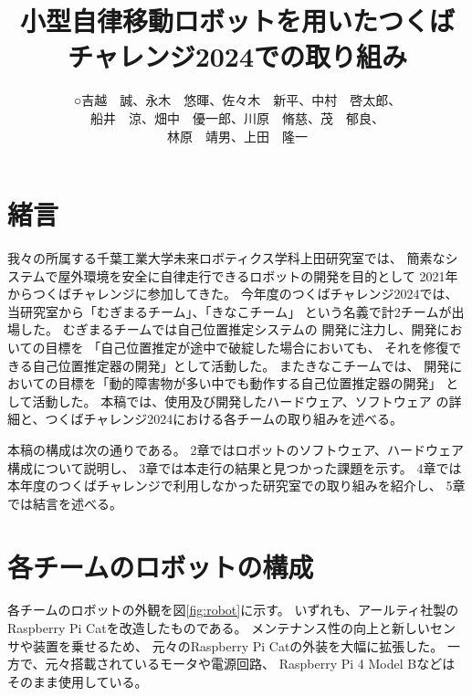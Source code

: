 \documentclass[twocolumn,9pt]{jsproceedings}
\title{小型自律移動ロボットを用いたつくばチャレンジ2024での取り組み}
\author{○吉越　誠\authorrefmark{2}、永木　悠暉\authorrefmark{1}、佐々木　新平\authorrefmark{1}、中村　啓太郎\authorrefmark{1}、
\\船井　涼\authorrefmark{2}、畑中　優一郎\authorrefmark{2}、川原　脩慈\authorrefmark{1}、茂　郁良\authorrefmark{1}、
\\林原　靖男\authorrefmark{1}、上田　隆一\authorrefmark{1}}
\affiliation{千葉工業大学 未来ロボティクス学科 上田研究室 むぎまるチーム/きなこチーム}
\begin{document}
\maketitle


\section{緒言}

我々の所属する千葉工業大学未来ロボティクス学科上田研究室では、
簡素なシステムで屋外環境を安全に自律走行できるロボットの開発を目的として
2021年からつくばチャレンジに参加してきた。
今年度のつくばチャレンジ2024では、
当研究室から「むぎまるチーム」、「きなこチーム」
という名義で計2チームが出場した。
むぎまるチームでは自己位置推定システムの
開発に注力し、開発においての目標を
「自己位置推定が途中で破綻した場合においても、
それを修復できる自己位置推定器の開発」として活動した。
またきなこチームでは、
開発においての目標を「動的障害物が多い中でも動作する自己位置推定器の開発」
として活動した。
本稿では、使用及び開発したハードウェア、ソフトウェア
の詳細と、つくばチャレンジ2024における各チームの取り組みを述べる。

本稿の構成は次の通りである。
2章ではロボットのソフトウェア、ハードウェア構成について説明し、
3章では本走行の結果と見つかった課題を示す。
4章では本年度のつくばチャレンジで利用しなかった研究室での取り組みを紹介し、
5章では結言を述べる。

\section{各チームのロボットの構成}
各チームのロボットの外観を図\ref{fig:robot}に示す。
いずれも、アールティ社製の
Raspberry Pi Cat\cite{RTshop}を改造したものである。
メンテナンス性の向上と新しいセンサや装置を乗せるため、
元々のRaspberry Pi Catの外装を大幅に拡張した。
一方で、元々搭載されているモータや電源回路、
Raspberry Pi 4 Model Bなどはそのまま使用している。
\end{document}
